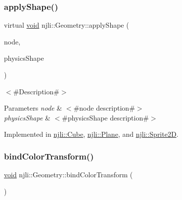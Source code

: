 \subsubsection{\texorpdfstring{apply\+Shape()}{applyShape()}}
{\footnotesize\ttfamily virtual \mbox{\hyperlink{_thread_8h_af1e856da2e658414cb2456cb6f7ebc66}{void}} njli\+::\+Geometry\+::apply\+Shape (\begin{DoxyParamCaption}\item[{\mbox{\hyperlink{classnjli_1_1_node}{Node}} $\ast$}]{node,  }\item[{\mbox{\hyperlink{classnjli_1_1_physics_shape}{Physics\+Shape}} $\ast$}]{physics\+Shape }\end{DoxyParamCaption})\hspace{0.3cm}{\ttfamily [pure virtual]}}

$<$\#\+Description\#$>$


\begin{DoxyParams}{Parameters}
{\em node} & $<$\#node description\#$>$ \\
\hline
{\em physics\+Shape} & $<$\#physics\+Shape description\#$>$ \\
\hline
\end{DoxyParams}


Implemented in \mbox{\hyperlink{classnjli_1_1_cube_ac3cffa5a972b0925f562fcabab368cd2}{njli\+::\+Cube}}, \mbox{\hyperlink{classnjli_1_1_plane_a12d8dcbd747c9d03aba34dbf864e4478}{njli\+::\+Plane}}, and \mbox{\hyperlink{classnjli_1_1_sprite2_d_ae5133dcfd1e31e9686c1240e86feb7d4}{njli\+::\+Sprite2D}}.

\mbox{\label{classnjli_1_1_geometry_ad8f86922c32926077dee808253fbc7df}} 
\subsubsection{\texorpdfstring{bind\+Color\+Transform()}{bindColorTransform()}}
{\footnotesize\ttfamily \mbox{\hyperlink{_thread_8h_af1e856da2e658414cb2456cb6f7ebc66}{void}} njli\+::\+Geometry\+::bind\+Color\+Transform (\begin{DoxyParamCaption}{ }\end{DoxyParamCaption})\hspace{0.3cm}{\ttfamily [private]}}

\mbox{\label{classnjli_1_1_geometry_a450c71467016f8266e29c7dbcde2c4c6}} 
